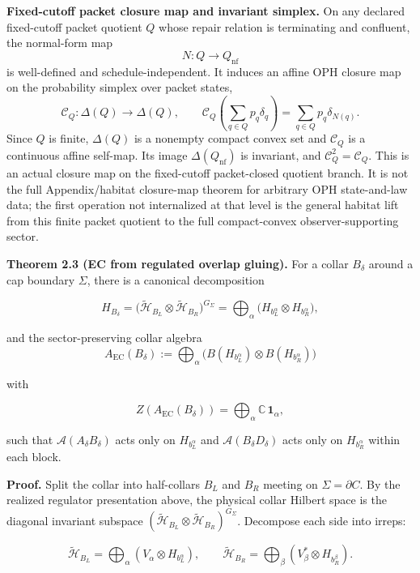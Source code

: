 \textbf{Fixed-cutoff packet closure map and invariant simplex.} On any declared fixed-cutoff
packet quotient \(Q\) whose repair relation is terminating and confluent, the normal-form map
\[
N:Q\to Q_{\mathrm{nf}}
\]
is well-defined and schedule-independent. It induces an affine OPH closure map on the probability
simplex over packet states,
\[
\mathcal C_Q:\Delta(Q)\to\Delta(Q),
\qquad
\mathcal C_Q\!\left(\sum_{q\in Q}p_q\delta_q\right)
=
\sum_{q\in Q}p_q\delta_{N(q)}.
\]
Since \(Q\) is finite, \(\Delta(Q)\) is a nonempty compact convex set and \(\mathcal C_Q\) is a
continuous affine self-map. Its image \(\Delta(Q_{\mathrm{nf}})\) is invariant, and
\(\mathcal C_Q^2=\mathcal C_Q\). This is an actual closure map on the fixed-cutoff packet-closed
quotient branch. It is not the full Appendix/habitat closure-map theorem for arbitrary OPH
state-and-law data; the first operation not internalized at that level is the general habitat lift
from this finite packet quotient to the full compact-convex observer-supporting sector.

\textbf{Theorem 2.3 (EC from regulated overlap gluing).} For a collar \(B_\delta\) around a cap boundary \(\Sigma\), there is a canonical decomposition

\[
H_{B_\delta} = \bigl(\tilde{\mathcal H}_{B_L}\otimes \tilde{\mathcal H}_{B_R}\bigr)^{G_\Sigma}
= \bigoplus_{\alpha}
\bigl(H_{b_L^{\alpha}} \otimes H_{b_R^{\alpha}}\bigr),
\]

and the sector-preserving collar algebra
\[
A_{\mathrm{EC}}(B_\delta):=\bigoplus_\alpha
\bigl(B(H_{b_L^\alpha}) \otimes B(H_{b_R^\alpha})\bigr)
\]

with

\[
Z(A_{\mathrm{EC}}(B_\delta)) = \bigoplus_\alpha \mathbb C\,\mathbf 1_\alpha,
\]

such that \(\mathcal{A}(A_\delta B_\delta)\) acts only on \(H_{b_L^\alpha}\) and \(\mathcal{A}(B_\delta D_\delta)\) acts only on \(H_{b_R^\alpha}\) within each block.

\textbf{Proof.} Split the collar into half-collars \(B_L\) and \(B_R\) meeting on \(\Sigma = \partial C\). By the realized regulator presentation above, the physical collar Hilbert space is the diagonal invariant subspace \((\tilde{\mathcal H}_{B_L} \otimes \tilde{\mathcal H}_{B_R})^{G_\Sigma}\). Decompose each side into irreps:

\[
\tilde{\mathcal H}_{B_L} = \bigoplus_\alpha (V_\alpha \otimes H_{b_L^\alpha}),\qquad
\tilde{\mathcal H}_{B_R} = \bigoplus_\beta (V_\beta^* \otimes H_{b_R^\beta}).
\]

